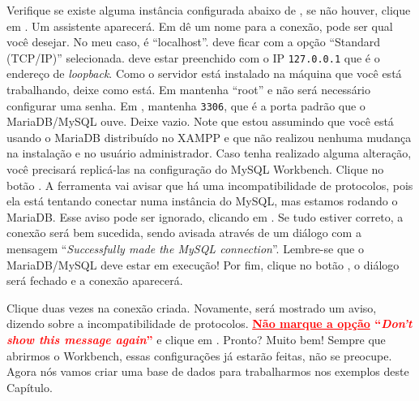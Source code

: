 Verifique se existe alguma instância configurada abaixo de , se não houver, clique em \destaque{\texttt{+}}. Um assistente aparecerá. Em  dê um nome para a conexão, pode ser qual você desejar. No meu caso, é ``localhost''.  deve ficar com a opção ``Standard (TCP/IP)'' selecionada.  deve estar preenchido com o IP \texttt{127.0.0.1} que é o endereço de \textit{loopback}. Como o servidor está instalado na máquina que você está trabalhando, deixe como está. Em  mantenha ``root'' e não será necessário configurar uma senha. Em , mantenha \texttt{3306}, que é a porta padrão que o MariaDB/MySQL ouve. Deixe  vazio. Note que estou assumindo que você está usando o MariaDB distribuído no XAMPP e que não realizou nenhuma mudança na instalação e no usuário administrador. Caso tenha realizado alguma alteração, você precisará replicá-las na configuração do MySQL Workbench. Clique no botão . A ferramenta vai avisar que há uma incompatibilidade de protocolos, pois ela está tentando conectar numa instância do MySQL, mas estamos rodando o MariaDB. Esse aviso pode ser ignorado, clicando em . Se tudo estiver correto, a conexão será bem sucedida, sendo avisada através de um diálogo com a mensagem ``\textit{Successfully made the MySQL connection}''. Lembre-se que o MariaDB/MySQL deve estar em execução! Por fim, clique no botão , o diálogo será fechado e a conexão aparecerá.

Clique duas vezes na conexão criada. Novamente, será mostrado um aviso, dizendo sobre a incompatibilidade de protocolos. \textcolor{red}{\textbf{\underline{Não marque a opção} ``\textit{Don't show this message again}''}} e clique em . Pronto? Muito bem! Sempre que abrirmos o Workbench, essas configurações já estarão feitas, não se preocupe. Agora nós vamos criar uma base de dados para trabalharmos nos exemplos deste Capítulo.

